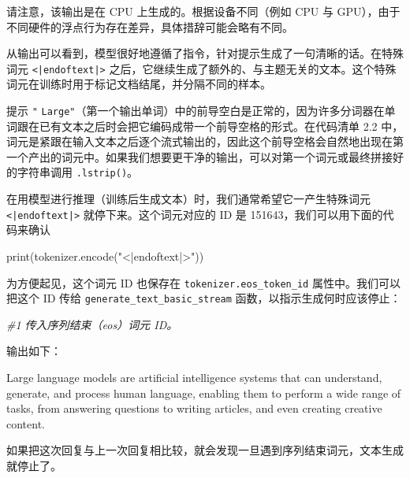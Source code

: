 请注意，该输出是在 CPU 上生成的。根据设备不同（例如 CPU 与 GPU），由于不同硬件的浮点行为存在差异，具体措辞可能会略有不同。

从输出可以看到，模型很好地遵循了指令，针对提示生成了一句清晰的话。在特殊词元 \texttt{\textless{}|endoftext|\textgreater{}} 之后，它继续生成了额外的、与主题无关的文本。这个特殊词元在训练时用于标记文档结尾，并分隔不同的样本。

\begin{myWarning}{提示}
 \texttt{"} \texttt{Large}\texttt{"}（第一个输出单词）中的前导空白是正常的，因为许多分词器在单词跟在已有文本之后时会把它编码成带一个前导空格的形式。在代码清单 2.2 中，词元是紧跟在输入文本之后逐个流式输出的，因此这个前导空格会自然地出现在第一个产出的词元中。如果我们想要更干净的输出，可以对第一个词元或最终拼接好的字符串调用 \texttt{.lstrip()}。\end{myWarning}

在用模型进行推理（训练后生成文本）时，我们通常希望它一产生特殊词元 \texttt{\textless{}|endoftext|\textgreater{}} 就停下来。这个词元对应的 ID 是 151643，我们可以用下面的代码来确认

\begin{codebox}
print(tokenizer.encode("<|endoftext|>"))
\end{codebox}

为方便起见，这个词元 ID 也保存在 \texttt{tokenizer.eos\_token\_id} 属性中。我们可以把这个 ID 传给 \texttt{generate\_text\_basic\_stream} 函数，以指示生成何时应该停止：

{\noindent\small\textit{\#1 传入序列结束（eos）词元 ID。}\par}

输出如下：

\begin{codebox}
 Large language models are artificial intelligence systems that can
understand, generate, and process human language, enabling them to
perform a wide range of tasks, from answering questions to writing
articles, and even creating creative content.
\end{codebox}

如果把这次回复与上一次回复相比较，就会发现一旦遇到序列结束词元，文本生成就停止了。

